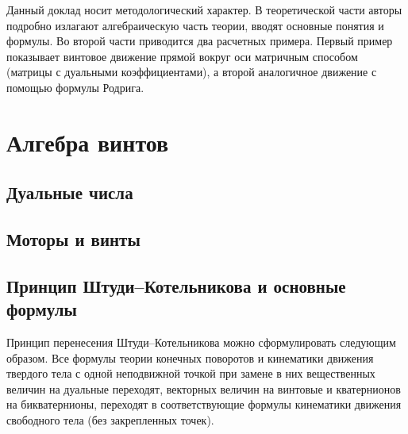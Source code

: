 \documentclass[%
]{ittmm}
\begin{document}
Данный доклад носит методологический характер. В теоретической части авторы подробно излагают алгебраическую часть теории, вводят основные понятия и формулы. Во второй части приводится два расчетных примера. Первый пример показывает винтовое движение прямой вокруг оси матричным способом (матрицы с дуальными коэффициентами), а второй аналогичное движение с помощью формулы Родрига.

\section{Алгебра винтов}

\subsection{Дуальные числа}

\subsection{Моторы и винты}

\subsection{Принцип Штуди--Котельникова и основные формулы}

Принцип перенесения Штуди--Котельникова можно сформулировать следующим образом. Все формулы теории конечных поворотов и кинематики движения твердого тела с одной неподвижной точкой при замене в них вещественных величин на дуальные переходят, векторных величин на винтовые и кватернионов на бикватернионы, переходят в соответствующие формулы кинематики движения свободного тела (без закрепленных точек).
\end{document}
